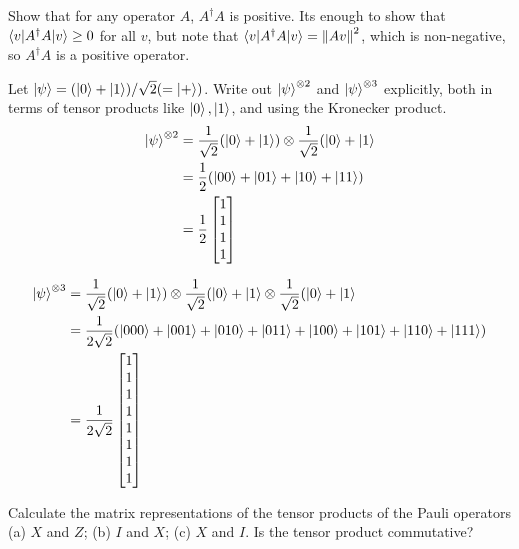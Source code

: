  Show that for any operator $A$, $A^\dagger A$ is positive.
\Soln Its enough to show that $\braket{v | A^\dagger A|v} \geq 0$ for all $v$, but note that $\braket{v| A^\dagger A|v} = \left\lVert Av\right\rVert^2$, which is non-negative, so $A^\dagger A$ is a positive operator.

 Let $\ket{\psi}=(\ket{0}+\ket{1})/\sqrt{2}(=\ket{+})$. Write out $\ket{\psi}^{\otimes2}$ and $\ket{\psi}^{\otimes3}$ explicitly, both in terms of tensor products like $\ket{0},\ket{1}$, and using the Kronecker product.
\Soln
\begin{align*}
	\ket{\psi}^{\otimes 2} &= \frac{1}{\sqrt{2}} (\ket{0} + \ket{1}) \otimes \frac{1}{\sqrt{2}} (\ket{0} + \ket{1}\\
		&= \frac{1}{2} (\ket{00}  + \ket{01} + \ket{10} + \ket{11}  )\\
		&= \frac{1}{2} \begin{bmatrix}
			1 \\
			1 \\
			1 \\
			1
		\end{bmatrix}
\end{align*}

\begin{align*}
	\ket{\psi}^{\otimes 3} &= \frac{1}{\sqrt{2}} (\ket{0} + \ket{1}) \otimes \frac{1}{\sqrt{2}} (\ket{0} + \ket{1}  \otimes \frac{1}{\sqrt{2}} (\ket{0} + \ket{1}\\
		&= \frac{1}{2\sqrt{2}} (\ket{000}  + \ket{001} + \ket{010} + \ket{011} +  \ket{100}  + \ket{101} + \ket{110} + \ket{111})\\
		&= \frac{1}{2\sqrt{2}} \begin{bmatrix}
			1 \\
			1 \\
			1 \\
			1 \\
			1 \\
			1 \\
			1 \\
			1
		\end{bmatrix}
\end{align*}


 Calculate the matrix representations of the tensor products of the Pauli operators (a) $X$ and $Z$; (b) $I$ and $X$; (c) $X$ and $I$. Is the tensor product commutative?

